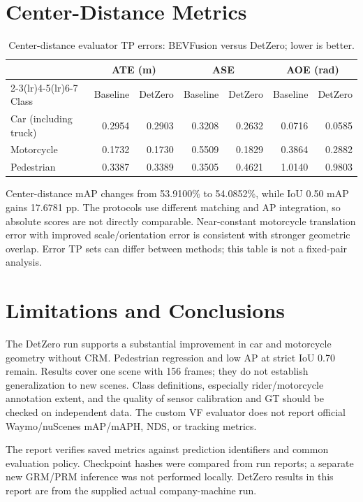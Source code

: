 \documentclass[a4paper,11pt]{article}
\begin{document}
\section{Center-Distance Metrics}
\begin{table}[H]\centering\small
\caption{Center-distance evaluator TP errors: BEVFusion versus DetZero; lower is better.}
\setlength{\tabcolsep}{5pt}
\begin{tabular}{lrrrrrr}\toprule
& \multicolumn{2}{c}{ATE (m)} & \multicolumn{2}{c}{ASE} & \multicolumn{2}{c}{AOE (rad)} \\
\cmidrule(lr){2-3}\cmidrule(lr){4-5}\cmidrule(lr){6-7}
Class & Baseline & DetZero & Baseline & DetZero & Baseline & DetZero \\
\midrule
Car (including truck) & 0.2954 & 0.2903 & 0.3208 & 0.2632 & 0.0716 & 0.0585 \\
Motorcycle & 0.1732 & 0.1730 & 0.5509 & 0.1829 & 0.3864 & 0.2882 \\
Pedestrian & 0.3387 & 0.3389 & 0.3505 & 0.4621 & 1.0140 & 0.9803 \\
\bottomrule\end{tabular}\end{table}
Center-distance mAP changes from 53.9100\% to 54.0852\%, while IoU 0.50 mAP gains 17.6781 pp. The protocols use different matching and AP integration, so absolute scores are not directly comparable. Near-constant motorcycle translation error with improved scale/orientation error is consistent with stronger geometric overlap. Error TP sets can differ between methods; this table is not a fixed-pair analysis.

\section{Limitations and Conclusions}
The DetZero run supports a substantial improvement in car and motorcycle geometry without CRM. Pedestrian regression and low AP at strict IoU 0.70 remain. Results cover one scene with 156 frames; they do not establish generalization to new scenes. Class definitions, especially rider/motorcycle annotation extent, and the quality of sensor calibration and GT should be checked on independent data. The custom VF evaluator does not report official Waymo/nuScenes mAP/mAPH, NDS, or tracking metrics.

The report verifies saved metrics against prediction identifiers and common evaluation policy. Checkpoint hashes were compared from run reports; a separate new GRM/PRM inference was not performed locally. DetZero results in this report are from the supplied actual company-machine run.
\end{document}
